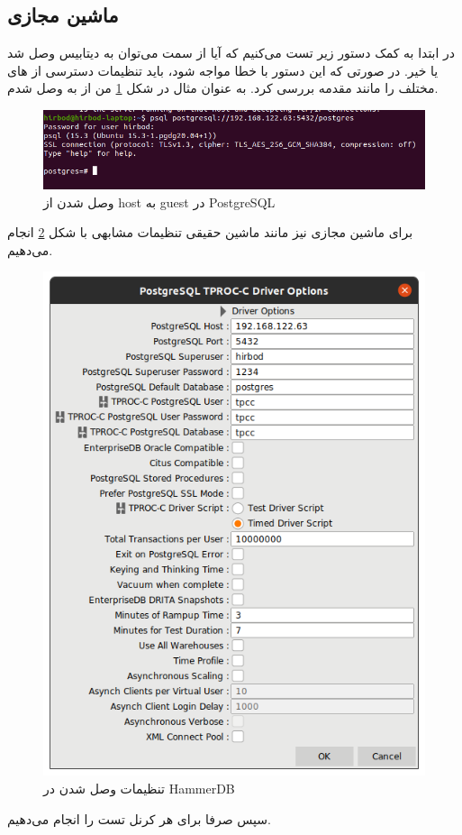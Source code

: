 \subsection{ماشین مجازی}
در ابتدا به کمک دستور زیر تست می‌کنیم که آیا از سمت
می‌توان به دیتابیس
وصل شد یا خیر. در صورتی که این دستور با خطا مواجه شود، باید تنظیمات دسترسی از
های
مختلف را مانند مقدمه بررسی کرد. به عنوان مثال در شکل
\ref{fig:postgres:vm:connection}
من از
 به 
وصل شدم.
\begin{figure}[H]
    \centering
    \includegraphics[scale=0.5]{pictures/postgres/vm/connection.png}
    \caption{وصل شدن از host به guest در PostgreSQL}
    \label{fig:postgres:vm:connection}
\end{figure}
برای ماشین مجازی نیز مانند ماشین حقیقی تنظیمات مشابهی با شکل
\ref{fig:postgres:vm:connection:hammerdb}
انجام می‌دهیم.
\begin{figure}[H]
    \centering
    \includegraphics[scale=0.42]{pictures/postgres/vm/connection-hammerdb.png}
    \caption{تنظیمات وصل شدن در HammerDB}
    \label{fig:postgres:vm:connection:hammerdb}
\end{figure}
سپس صرفا برای هر کرنل تست را انجام می‌دهیم.